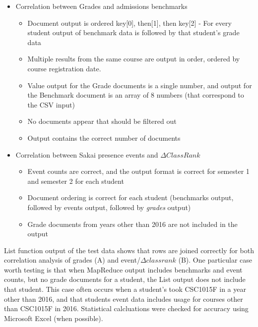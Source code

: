\begin{itemize}
  \item Correlation between Grades and admissions benchmarks
        \begin{itemize}
          \item Document output is ordered key[0], then[1], then key[2] - For every student output of benchmark data is followed by that student's grade data
          \item Multiple results from the same course are output in order, ordered by course registration date.
          \item Value output for the Grade documents is a single number, and output for the Benchmark document is an array of 8 numbers (that correspond to the CSV input)
          \item No documents appear that should be filtered out
          \item Output contains the correct number of documents
        \end{itemize}
  \item Correlation between Sakai presence events and $\Delta ClassRank$
        \begin{itemize}
          \item Event counts are correct, and the output format is correct for semester 1 and semester 2 for each student
          \item Document ordering is correct for each student (benchmarks output, followed by events output, followed by \textit{grades} output)
          \item Grade documents from years other than 2016 are not included in the output
        \end{itemize}
\end{itemize}

List function output of the test data shows that rows are joined correctly for both correlation analysis of grades (A) and event/$\Delta classrank$ (B). One particular case worth testing is that when MapReduce output includes benchmarks and event counts, but no grade documents for a student, the List output does not include that student. This case often occurs when a student's took CSC1015F in a year other than 2016, and that students event data includes usage for courses other than CSC1015F in 2016. Statistical calcluations were checked for accuracy using Microsoft Excel (when possible).